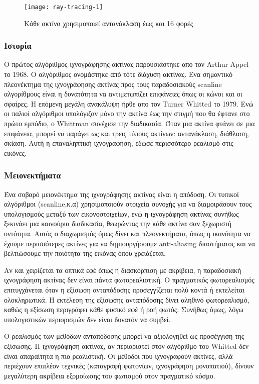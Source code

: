 \begin{figure}[h]
\centering
\texttt{[image: ray-tracing-1]}
\caption{Κάθε ακτίνα χρησιμοποιεί αντανάκλαση έως και 16 φορές}
\end{figure}

\subsubsection{Ιστορία}
Ο πρώτος αλγόριθμος ιχνογράφησης ακτίνας παρουσιάστηκε απο τον Arthur Appel το 1968. Ο αλγόριθμος ονομάστηκε από τότε διάχυση ακτίνας. Ένα σημαντικό πλεονέκτημα της ιχνογράφησης ακτίνας προς τους παραδοσιακούς scanline αλγορίθμους είναι η δυνατότητα να αντιμετωπίζει επιφάνειες όπως οι κώνοι και οι σφαίρες. Η επόμενη μεγάλη ανακάλυψη ήρθε απο τον Turner Whitted το 1979. Ενώ οι παλιοί αλγόριθμοι υπολόγιζαν μόνο την ακτίνα έως την στιγμή που θα έφτανε στο πρώτο εμπόδιο, ο Whittman συνέχισε την διαδικασία. Όταν μια ακτίνα φτάνει σε μια επιφάνεια, μπορεί να παράγει ως και τρεις τύπους ακτίνων: αντανάκλαση, διάθλαση, σκίαση. Αυτή η επαναληπτική ιχνογράφηση, έδωσε περισσότερο ρεαλισμό στις εικόνες.

\subsubsection{Μειονεκτήματα}
Ένα σοβαρό μειονέκτημα της ιχνογράφησης ακτίνας είναι η απόδοση. Οι τυπικοί αλγόριθμοι (scanline,κ.α) χρησιμοποιούν στοιχεία συνοχής για να διαμοιράσουν τους υπολογισμούς μεταξύ των εικονοστοιχείων, ενώ η ιχνογράφηση ακτίνας συνήθως ξεκινάει μια καινούρια διαδικασία, θεωρώντας την κάθε ακτίνα σαν ξεχωριστή οντότητα. Αυτός ο διαχωρισμός όμως δίνει και πλεονεκτήματα, όπως η ικανότητα να έχουμε περισσότερες ακτίνες για να δημιουργήσουμε anti-aliasing διαστήματος και να βελτιώσουμε την ποιότητα της εικόνας όπου χρειάζεται.

Αν και χειρίζεται τα οπτικά εφέ όπως η διασκόρπιση με ακρίβεια, η παραδοσιακή ιχνογράφηση ακτίνας δεν είναι πάντα φωτορεαλιστική. Ο πραγματικός φωτορεαλισμός επιτυγχάνεται όταν η εξίσωση ανταπόδοσης προσεγγίζεται πολύ κοντά ή εκτελείται ολοκληρωτικά. Η εκτέλεση της εξίσωσης ανταπόδοσης δίνει αληθινό φωτορεαλισμό, καθώς η εξίσωση περιγράφει κάθε φυσικό εφέ ή ροή φωτός. Συνήθως όμως, λόγω υπολογιστικών περιορισμών δεν είναι δυνατόν να συμβεί.

Ο ρεαλισμός των μεθόδων ανταπόδοσης μπορεί να αξιολογηθεί ως προσέγγιση της εξίσωσης. Η ιχνογράφηση ακτίνας, αν περιοριστεί στον αλγόριθμο του Whitted δεν είναι απαραίτητα η πιο ρεαλιστική. Οι μέθοδοι που ιχνογραφούν ακτίνες, αλλά περιέχουν επιπλέον τεχνικές (καταγραφή φωτονίων, ιχνογράφηση μονοπατιού), δίνουν μεγαλύτερη ακρίβεια εξομοίωσης του φωτισμού στον πραγματικό κόσμο.

